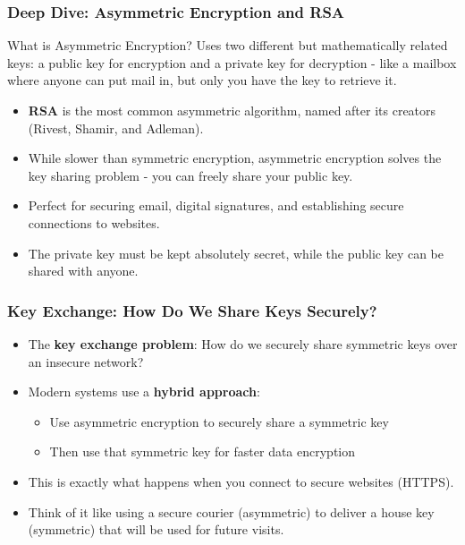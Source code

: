 \documentclass{beamer}
\begin{document}
\begin{frame}
    \frametitle{Deep Dive: Asymmetric Encryption and RSA}
    
    \begin{block}{What is Asymmetric Encryption?}
        Uses two different but mathematically related keys: a public key for encryption and a private key for decryption - like a mailbox where anyone can put mail in, but only you have the key to retrieve it.
    \end{block}
    
    \begin{itemize}
        \item \textbf{RSA} is the most common asymmetric algorithm, named after its creators (Rivest, Shamir, and Adleman).
        
        \item While slower than symmetric encryption, asymmetric encryption solves the key sharing problem - you can freely share your public key.
        
        \item Perfect for securing email, digital signatures, and establishing secure connections to websites.
        
        \item The private key must be kept absolutely secret, while the public key can be shared with anyone.
    \end{itemize}
\end{frame}



\begin{frame}
    \frametitle{Key Exchange: How Do We Share Keys Securely?}
    
    \begin{itemize}
        \item The \textbf{key exchange problem}: How do we securely share symmetric keys over an insecure network?
        
        \item Modern systems use a \textbf{hybrid approach}:
            \begin{itemize}
                \item Use asymmetric encryption to securely share a symmetric key
                \item Then use that symmetric key for faster data encryption
            \end{itemize}
        
        \item This is exactly what happens when you connect to secure websites (HTTPS).
        
        \item Think of it like using a secure courier (asymmetric) to deliver a house key (symmetric) that will be used for future visits.
    \end{itemize}
\end{frame}
\end{document}
